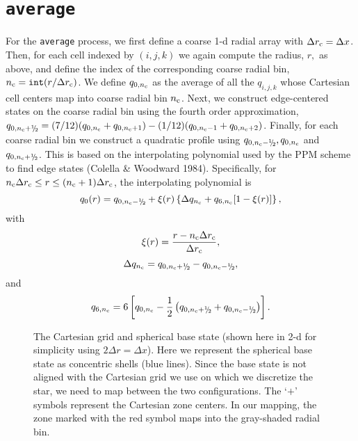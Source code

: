 \section{{\tt average}}\label{Sec:Avg}
For the {\tt average} process, we first define a coarse 1-d radial array 
with $\Delta r_{\rm c} = \Delta x$.  Then, for each cell indexed by
$(i,j,k)$ we again compute the radius, $r,$ as above, and 
define the index of the corresponding coarse radial bin, 
$n_{\rm c} = \mathtt{int}(r / \Delta r_{\rm c})$.  
We define $q_{0,n_{\rm c}}$ as the average of all the $q_{i,j,k}$ whose 
Cartesian cell centers map into coarse radial bin $n_{\rm c}$.
Next, we construct edge-centered states on the coarse radial bin using 
the fourth order approximation,
$q_{0,n_{\rm c}+\myhalf} = (7/12)(q_{0,n_{\rm c}}+q_{0,n_{\rm c}+1}) 
- (1/12)(q_{0,n_{\rm c}-1}+q_{0,n_{\rm c}+2})$.  Finally, for each coarse radial bin
we construct a quadratic profile using $q_{0,n_{\rm c}-\myhalf}, q_{0,n_{\rm c}}$ 
and $q_{0,n_{\rm c}+\myhalf}$.  This is based on the interpolating polynomial used by 
the PPM scheme to find edge states (Colella \& Woodward 1984).  Specifically, for 
$n_{\rm c}\Delta r_{\rm c} \le r \le (n_{\rm c}+1)\Delta r_{\rm c}$, the 
interpolating polynomial is
\begin{equation}
q_0(r) = q_{0,n_{\rm c}-\myhalf} + \xi(r)\left\{\Delta q_{n_{\rm c}} + q_{6,n_{\rm c}}[1 - \xi(r)]\right\},
\end{equation}
with
\begin{equation}
\xi(r) = \frac{r - n_{\rm c}\Delta r_{\rm c}}{\Delta r_{\rm c}},
\end{equation}
\begin{equation}
\Delta q_{n_{\rm c}} = q_{0,n_{\rm c}+\myhalf} - q_{0,n_{\rm c}-\myhalf},
\end{equation}
and
\begin{equation}
q_{6,n_{\rm c}} = 6\left[q_{0,n_{\rm c}} - 
\frac{1}{2}\left(q_{0,n_{\rm c}+\myhalf} + q_{0,n_{\rm c}-\myhalf}\right)\right].
\end{equation}

\clearpage

\begin{figure}[tpb]
\begin{center}
\caption{\label{fig:mapping} The Cartesian grid and spherical base
state (shown here in 2-d for simplicity using $2 \Delta r = \Delta x$).
Here we represent the
spherical base state as concentric shells (blue lines).  Since the
base state is not aligned with the Cartesian grid we use on which
we discretize the star, we need to map between the two configurations.
The `$+$' symbols represent the Cartesian zone centers.  In our
mapping, the zone marked with the red symbol maps into the gray-shaded
radial bin. }
\label{fig:mapping}
\end{center}
\end{figure}
